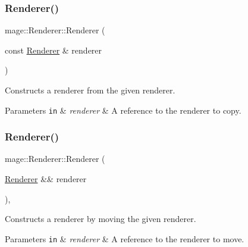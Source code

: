 \subsubsection{\texorpdfstring{Renderer()}{Renderer()}\hspace{0.1cm}{\footnotesize\ttfamily [2/3]}}
{\footnotesize\ttfamily mage\+::\+Renderer\+::\+Renderer (\begin{DoxyParamCaption}\item[{const \hyperlink{classmage_1_1_renderer}{Renderer} \&}]{renderer }\end{DoxyParamCaption})\hspace{0.3cm}{\ttfamily [delete]}}

Constructs a renderer from the given renderer.


\begin{DoxyParams}[1]{Parameters}
\mbox{\tt in}  & {\em renderer} & A reference to the renderer to copy. \\
\hline
\end{DoxyParams}
\hypertarget{classmage_1_1_renderer_a50dcb6da913089a97475b2d1c0d0062e}{}\label{classmage_1_1_renderer_a50dcb6da913089a97475b2d1c0d0062e} 
\subsubsection{\texorpdfstring{Renderer()}{Renderer()}\hspace{0.1cm}{\footnotesize\ttfamily [3/3]}}
{\footnotesize\ttfamily mage\+::\+Renderer\+::\+Renderer (\begin{DoxyParamCaption}\item[{\hyperlink{classmage_1_1_renderer}{Renderer} \&\&}]{renderer }\end{DoxyParamCaption})\hspace{0.3cm}{\ttfamily [default]}, {\ttfamily [noexcept]}}

Constructs a renderer by moving the given renderer.


\begin{DoxyParams}[1]{Parameters}
\mbox{\tt in}  & {\em renderer} & A reference to the renderer to move. \\
\hline
\end{DoxyParams}
\hypertarget{classmage_1_1_renderer_a997e041f28cc71d069d1ab7d29fe6ced}{}\label{classmage_1_1_renderer_a997e041f28cc71d069d1ab7d29fe6ced} 
